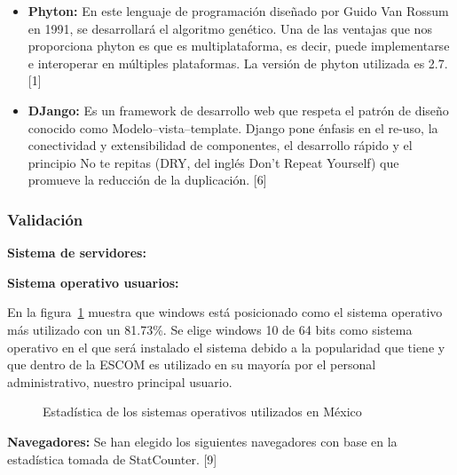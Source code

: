 	\begin{itemize}
		\item \textbf{Phyton:} En este lenguaje de programación diseñado por Guido Van Rossum en 1991, se desarrollará el algoritmo genético. Una de las ventajas que nos proporciona phyton es que es multiplataforma, es decir, puede implementarse e interoperar en múltiples plataformas. La versión de phyton utilizada es 2.7. [1] 
		
		\item \textbf{DJango:} Es un framework de desarrollo web que respeta el patrón de diseño conocido como Modelo–vista–template. Django pone énfasis en el re-uso, la conectividad y extensibilidad de componentes, el desarrollo rápido y el principio No te repitas (DRY, del inglés Don't Repeat Yourself) que promueve la reducción de la duplicación. [6]
		
	\end{itemize}
	
		
	\subsubsection{Validación}
	
		\textbf{Sistema de servidores:}
		
		\textbf{Sistema operativo usuarios:} 
		
		En la figura~\ref{fig:so} muestra que windows está posicionado como el sistema operativo más utilizado con un 81.73\%. Se elige windows 10 de 64 bits como sistema operativo en el que será instalado el sistema debido a la popularidad que tiene y que dentro de la ESCOM es utilizado en su mayoría por el personal administrativo, nuestro principal usuario.
				
		\begin{figure}[htbp!]
			\begin{center}
				\caption{Estadística de los sistemas operativos utilizados en México}
				\label{fig:so}
			\end{center}
		\end{figure}
				
				
		\textbf{Navegadores:} Se han elegido los siguientes navegadores con base en la estadística tomada de StatCounter. [9] \\

